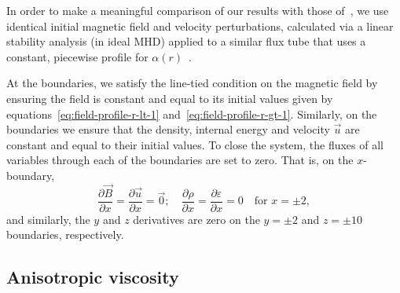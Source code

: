In order to make a meaningful comparison of our results with those of~\cite{hoodCoronalHeatingMagnetic2009}, we use identical initial magnetic field and velocity perturbations, calculated via a linear stability analysis (in ideal MHD) applied to a similar flux tube that uses a constant, piecewise profile for $\alpha(r)$~\cite{vanderlindenCompleteCoronalLoop1999,browningSolarCoronalHeating2003,browningHeatingCoronaNanoflares2008a}.

At the boundaries, we satisfy the line-tied condition on the magnetic field by ensuring the field is constant and equal to its initial values given by equations~\eqref{eq:field-profile-r-lt-1} and~\eqref{eq:field-profile-r-gt-1}. Similarly, on the boundaries we ensure that the density, internal energy and velocity $\vec{u}$ are constant and equal to their initial values. To close the system, the fluxes of all variables through each of the boundaries are set to zero. That is, on the $x$-boundary,
\begin{equation}
  \frac{\partial \vec{B}}{\partial x} = \frac{\partial \vec{u}}{\partial x} = \vec{0}; \quad \frac{\partial \rho}{\partial x} = \frac{\partial \varepsilon}{\partial x} = 0 \quad \text{for } x=\pm 2,
\end{equation}
and similarly, the $y$ and $z$ derivatives are zero on the $y=\pm2$ and $z=\pm10$ boundaries, respectively.

\subsection{Anisotropic viscosity}

